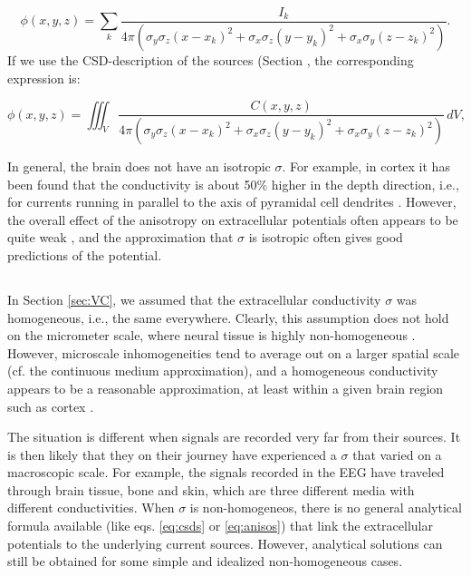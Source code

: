 \begin{equation}
\phi(x,y,z) = \sum_k \frac{I_k}{4\pi(\sigma_y\sigma_z (x-x_k)^2 + \sigma_x\sigma_z (y-y_k)^2 + \sigma_x\sigma_y (z-z_k)^2)}.
\label{eq:Panisos}
\end{equation}
If we use the CSD-description of the sources (Section \label{eq:csds}, the corresponding expression is:

\begin{equation}
\phi(x,y,z) = \iiint_V \frac{C(x,y,z)}{4\pi(\sigma_y\sigma_z (x-x_k)^2 + \sigma_x\sigma_z (y-y_k)^2 + \sigma_x\sigma_y (z-z_k)^2)} \, dV, 
\label{eq:Canisos}
\end{equation}

In general, the brain does not have an isotropic $\sigma$. For example, in cortex it has been found that the conductivity is about 50\% higher in the depth direction, i.e., for currents running in parallel to the axis of pyramidal cell dendrites \citep{Goto2010}. However, the overall effect of the anisotropy on extracellular potentials often appears to be quite weak \citep{Ness2015}, and the approximation that $\sigma$ is isotropic often gives good predictions of the potential.


\subsection{}
\label{sec:nonhomo}
In Section \ref{sec:VC}, we assumed that the extracellular conductivity $\sigma$ was homogeneous, i.e., the same everywhere. Clearly, this assumption does not hold on the micrometer scale, where neural tissue is highly non-homogeneous \citep{Nicholson1998}. However, microscale inhomogeneities tend to average out on a larger spatial scale (cf. the continuous medium approximation), and a homogeneous conductivity appears to be a reasonable approximation, at least within a given brain region such as cortex \citep{Logothetis2007}. 

The situation is different when signals are recorded very far from their sources. It is then likely that they on their journey have experienced a $\sigma$ that varied on a macroscopic scale. For example, the signals recorded in the EEG have traveled through brain tissue, bone and skin, which are three different media with different conductivities. When $\sigma$ is non-homogeneos, there is no general analytical formula available (like eqs. \ref{eq:csds} or \ref{eq:anisos}) that link the extracellular potentials to the underlying current sources. However, analytical solutions can still be obtained for some simple and idealized non-homogeneous cases. 

